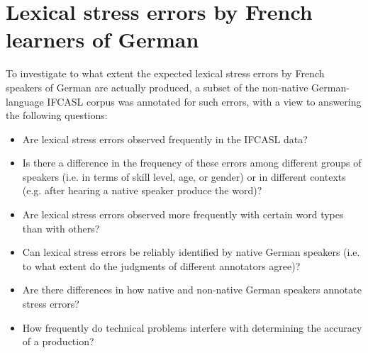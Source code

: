 %
%

\chapter{Lexical stress errors by French learners of German}
\label{chap:lexstress}



%	
	
	

	To investigate to what extent the expected lexical stress errors by French speakers of German are actually produced, a subset of the non-native German-language IFCASL corpus was annotated for such errors, with a view to answering the following questions:

	\begin{itemize}
	\item{Are lexical stress errors observed frequently in the IFCASL data?}
	\item{Is there a difference in the frequency of these errors among different groups of speakers (i.e. in terms of skill level, age, or gender) or in different contexts (e.g. after hearing a native speaker produce the word)?}
	\item{Are lexical stress errors observed more frequently with certain word types than with others?}
	\item{Can lexical stress errors be reliably identified by native German speakers (i.e. to what extent do the judgments of different annotators agree)?}
	\item{Are there differences in how native and non-native German speakers annotate stress errors?}
	\item{How frequently do technical problems interfere with determining the accuracy of a production?}
	\end{itemize}
	

